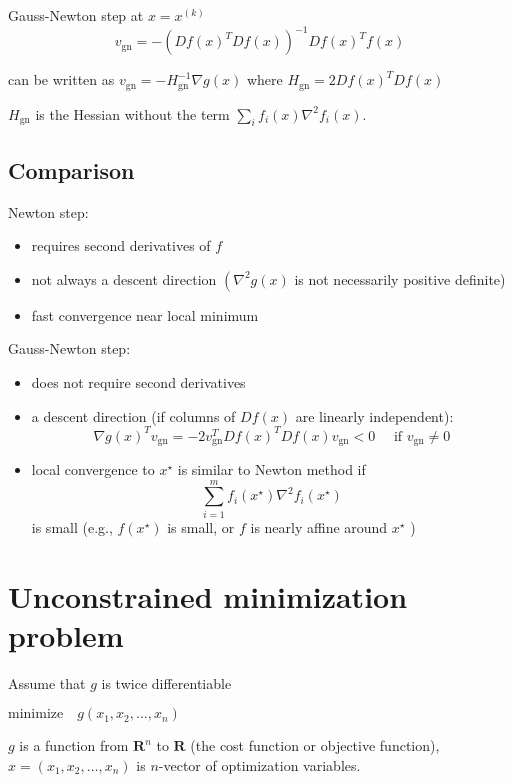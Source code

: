 \begin{theorem}
    Gauss-Newton step at $ x=x^{(k)} $
$$
v_{\mathrm{gn}}=-\left(D f(x)^{T} D f(x)\right)^{-1} D f(x)^{T} f(x)
$$
\end{theorem}

\begin{corollary}
    can be written as $ v_{\mathrm{gn}}=-H_{\mathrm{gn}}^{-1} \nabla g(x) $ where $ H_{\mathrm{gn}}=2 D f(x)^{T} D f(x) $

    $ H_{\mathrm{gn}} $ is the Hessian without the term $ \sum_{i} f_{i}(x) \nabla^{2} f_{i}(x) $.
\end{corollary}





\subsection{Comparison}

Newton step:
\begin{itemize}
    \item requires second derivatives of $ f $
    \item not always a descent direction $ \left(\nabla^{2} g(x)\right. $ is not necessarily positive definite)
    \item fast convergence near local minimum
\end{itemize}


Gauss-Newton step:
\begin{itemize}
    \item does not require second derivatives
    \item a descent direction (if columns of $ D f(x) $ are linearly independent):
    $$
    \nabla g(x)^{T} v_{\mathrm{gn}}=-2 v_{\mathrm{gn}}^{T} D f(x)^{T} D f(x) v_{\mathrm{gn}}<0 \quad \text { if } v_{\mathrm{gn}} \neq 0
    $$
    \item local convergence to $ x^{\star} $ is similar to Newton method if
$$
\sum_{i=1}^{m} f_{i}\left(x^{\star}\right) \nabla^{2} f_{i}\left(x^{\star}\right)
$$
is small (e.g., $ f\left(x^{\star}\right) $ is small, or $ f $ is nearly affine around $ x^{\star} $ )
\end{itemize}


\section{Unconstrained minimization problem}

\begin{problem}
    Assume that $ g $ is twice differentiable

    $\text{minimize} \quad g\left(x_{1}, x_{2}, \ldots, x_{n}\right) $

    $ g $ is a function from $ \mathbf{R}^{n} $ to $ \mathbf{R} $ (the cost function or objective function), $ x=\left(x_{1}, x_{2}, \ldots, x_{n}\right) $ is $ n $-vector of optimization variables.
\end{problem}

